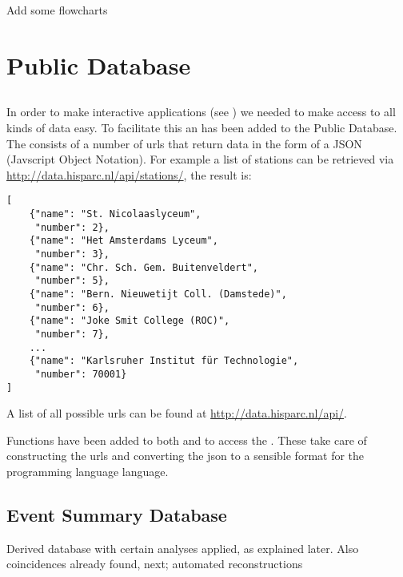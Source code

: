 Add some flowcharts


\section{\hisparc Public Database}

\subsection{\api}

In order to make interactive applications (see \jsparc) we needed to make
access to all kinds of data easy. To facilitate this an \api has been
added to the Public Database. The \api consists of a number of urls that
return data in the form of a JSON (Javscript Object Notation). For
example a list of \hisparc stations can be retrieved via
\url{http://data.hisparc.nl/api/stations/}, the result is:

\begin{verbatim}
[
    {"name": "St. Nicolaaslyceum",
     "number": 2},
    {"name": "Het Amsterdams Lyceum",
     "number": 3},
    {"name": "Chr. Sch. Gem. Buitenveldert",
     "number": 5},
    {"name": "Bern. Nieuwetijt Coll. (Damstede)",
     "number": 6},
    {"name": "Joke Smit College (ROC)",
     "number": 7},
    ...
    {"name": "Karlsruher Institut für Technologie",
     "number": 70001}
]
\end{verbatim}

A list of all possible urls can be found at \url{http://data.hisparc.nl/api/}.

Functions have been added to both \sapphire and \jsparc to access the
\api. These take care of constructing the urls and converting the json to a
sensible format for the programming language language.


\subsection{Event Summary Database}

Derived database with certain analyses applied, as explained later. Also
coincidences already found, next; automated reconstructions


\section{\sapphire}

\subsection{\pypi}

